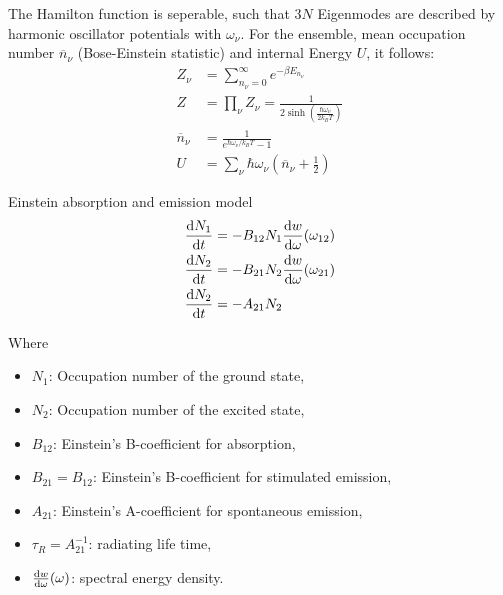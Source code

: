 			\noindent
			The Hamilton function is seperable, such that $3N$ Eigenmodes are described by harmonic oscillator potentials with $\omega_\nu$. For the ensemble, mean occupation number $\overline{n}_\nu$ (Bose-Einstein statistic) and internal Energy $U$, it follows:
			\begin{equation}
				\begin{aligned}
					Z_\nu &= \sum_{n_\nu=0}^\infty e^{-\beta E_{n_\nu}} \\
					Z &= \prod_\nu Z_\nu = \frac{1}{2\sinh{\left( \frac{\hbar\omega_\nu}{2 k_B T} \right)}} \\
					\overline{n}_\nu &= \frac{1}{e^{\hbar\omega_\nu/k_B T} - 1} \\
					U &= \sum_\nu \hbar\omega_\nu \left(\overline{n}_\nu + \frac{1}{2}\right)
				\end{aligned}
			\end{equation}


			\noindent
			Einstein absorption and emission model
			\begin{equation}
				\begin{aligned}
					\frac{\mathrm{d} N_1}{\mathrm{d} t} &= -B_{12}N_1 \frac{\mathrm{d} w}{\mathrm{d} \omega}(\omega_{12}) \\
					\frac{\mathrm{d} N_2}{\mathrm{d} t} &= -B_{21}N_2 \frac{\mathrm{d} w}{\mathrm{d} \omega}(\omega_{21}) \\
					\frac{\mathrm{d} N_2}{\mathrm{d} t} &= -A_{21}N_2\\
				\end{aligned}
			\end{equation}

			\noindent
			Where
			\begin{itemize}
  				\setlength\itemsep{0pt}
				\item[] $N_1$: Occupation number of the ground state,
				\item[] $N_2$: Occupation number of the excited state,
				\item[] $B_{12}$: Einstein's B-coefficient for absorption,
				\item[] $B_{21} = B_{12}$: Einstein's B-coefficient for stimulated emission,
				\item[] $A_{21}$: Einstein's A-coefficient for spontaneous emission,
				\item[] $\tau_{R}=A_{21}^{-1}$: radiating life time,
				\item[] $\frac{\mathrm{d} w}{\mathrm{d} \omega}(\omega)$: spectral energy density.
			\end{itemize}

